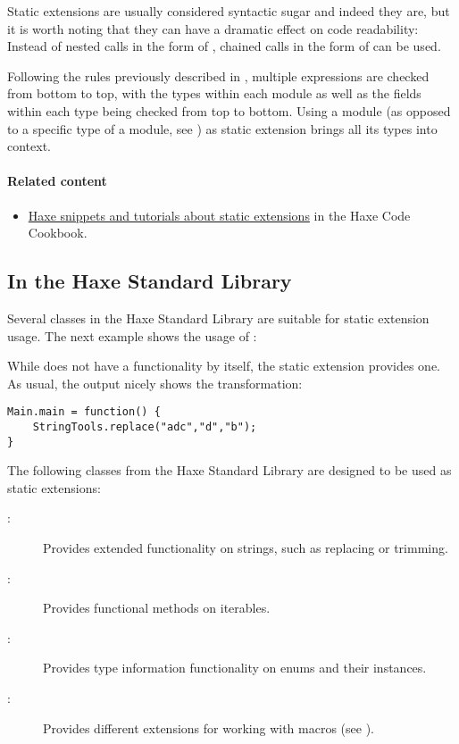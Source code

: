 Static extensions are usually considered syntactic sugar and indeed they are, but it is worth noting that they can have a dramatic effect on code readability: Instead of nested calls in the form of , chained calls in the form of  can be used.

Following the rules previously described in , multiple  expressions are checked from bottom to top, with the types within each module as well as the fields within each type being checked from top to bottom. Using a module (as opposed to a specific type of a module, see ) as static extension brings all its types into context.


\paragraph{Related content}
\begin{itemize}
	\item \href{http://code.haxe.org/tag/static-extension.html}{Haxe snippets and tutorials about static extensions} in the Haxe Code Cookbook.
\end{itemize}


\subsection{In the Haxe Standard Library}
\label{lf-static-extension-in-std}

Several classes in the Haxe Standard Library are suitable for static extension usage. The next example shows the usage of :


While  does not have a  functionality by itself, the  static extension provides one. As usual, the  output nicely shows the transformation:

\begin{lstlisting}
Main.main = function() {
	StringTools.replace("adc","d","b");
}
\end{lstlisting}

The following classes from the Haxe Standard Library are designed to be used as static extensions:

\begin{description}
	\item[:] Provides extended functionality on strings, such as replacing or trimming.
	\item[:] Provides functional methods on iterables.
	\item[:] Provides type information functionality on enums and their instances.
	\item[:] Provides different extensions for working with macros (see ).
\end{description}



